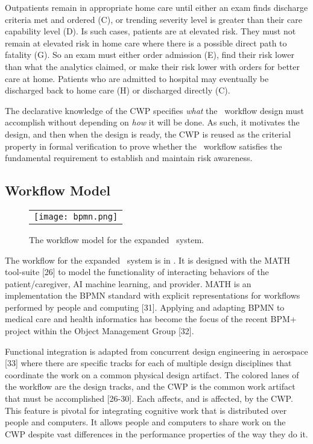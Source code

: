 Outpatients remain in appropriate home care until either an exam finds discharge criteria met and ordered (C), or trending severity level is greater than their care capability level (D). Is such cases, patients are at elevated risk. They must not remain at elevated risk in home care where there is a possible direct path to fatality (G). So an exam must either order admission (E), find their risk lower than what the analytics claimed, or make their risk lower with orders for better care at home. Patients who are admitted to hospital may eventually be discharged back to home care (H) or discharged directly (C). 

The declarative knowledge of the CWP specifies \emph{what} the \phware\ workflow design must accomplish without depending on \emph{how} it will be done. As such, it motivates the design, and then when the design is ready, the CWP is reused as the criterial property in formal verification to prove whether the \phware\ workflow satisfies the fundamental requirement to establish and maintain risk awareness. 

\subsection{Workflow Model}
\begin{figure*}
  \begin{center}
    \begin{tabular}{c}
      \texttt{[image: bpmn.png]}
    \end{tabular}
  \end{center}
\caption{The workflow model for the expanded \phware\ system.}
\label{fig:bpmn}
\end{figure*}

The workflow for the expanded \phware\ system is in . It is designed with the MATH tool-suite [26] to model the functionality of interacting behaviors of the patient/caregiver, AI machine learning, and provider. MATH is an implementation the BPMN standard with explicit representations for workflows performed by people and computing [31]. Applying and adapting BPMN to medical care and health informatics has become the focus of the recent BPM+ project within the Object Management Group [32]. 

Functional integration is adapted from concurrent design engineering in aerospace [33] where there are specific tracks for each of multiple design disciplines that coordinate the work on a common physical design artifact. The colored lanes of the workflow are the design tracks, and the CWP is the common work artifact that must be accomplished [26-30]. Each affects, and is affected, by the CWP. This feature is pivotal for integrating cognitive work that is distributed over people and computers. It allows people and computers to share work on the CWP despite vast differences in the performance properties of the way they do it. 

